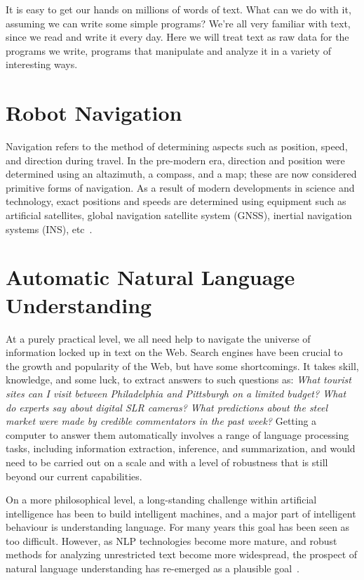 It is easy to get our hands on millions of words of text. What can we do with it, assuming we can write some simple programs? We're all very familiar with text, since we read and write it every day. Here we will treat text as raw data for the programs we write, programs that manipulate and analyze it in a variety of interesting ways.
\section{Robot Navigation}
Navigation refers to the method of determining aspects such as position, speed, and direction during travel. In the pre-modern era, direction and position were determined using an altazimuth, a compass, and a map; these are now considered primitive forms of navigation. As a result of modern developments in science and technology, exact positions and speeds are determined using equipment such as artificial satellites, global navigation satellite system (GNSS), inertial navigation systems (INS), etc~\cite{NAV}.

\section{Automatic Natural Language Understanding}
At a purely practical level, we all need help to navigate the universe of information locked up in text on the Web. Search engines have been crucial to the growth and popularity of the Web, but have some shortcomings. It takes skill, knowledge, and some luck, to extract answers to such questions as: \emph{What tourist sites can I visit between Philadelphia and Pittsburgh on a limited budget? What do experts say about digital SLR cameras? What predictions about the steel market were made by credible commentators in the past week?}  Getting a computer to answer them automatically involves a range of language processing tasks, including information extraction, inference, and summarization, and would need to be carried out on a scale and with a level of robustness that is still beyond our current capabilities.

On a more philosophical level, a long-standing challenge within artificial intelligence has been to build intelligent machines, and a major part of intelligent behaviour is understanding language. For many years this goal has been seen as too difficult. However, as NLP technologies become more mature, and robust methods for analyzing unrestricted text become more widespread, the prospect of natural language understanding has re-emerged as a plausible goal~\cite{NLPbook}.

